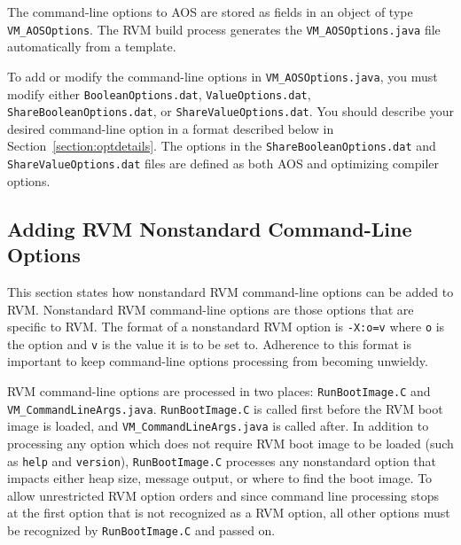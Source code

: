 The command-line options to AOS are
stored as fields in an object of type {\tt VM\_AOSOptions}.
The RVM build process generates the {\tt VM\_AOSOptions.java} 
file automatically from a template.  

To add or modify the command-line options in {\tt VM\_AOSOptions.java},
you must modify either {\tt BooleanOptions.dat}, {\tt ValueOptions.dat},
{\tt ShareBooleanOptions.dat}, or {\tt ShareValueOptions.dat}.
You should describe your desired command-line option in a format 
described below in Section~\ref{section:optdetails}.
The options in the {\tt ShareBooleanOptions.dat} and {\tt ShareValueOptions.dat}
files are defined as both AOS and optimizing compiler options.

\subsection{Adding RVM Nonstandard Command-Line Options}

This section states how nonstandard RVM command-line options can be added
to RVM.  
Nonstandard RVM command-line options are those options that are specific to RVM.
The format of a nonstandard RVM option is {\tt -X:o=v} where {\tt o} is the 
option and {\tt v} is the value it is to be set to.
Adherence to this format is important to keep command-line options processing
from becoming unwieldy.

RVM command-line options are processed in two places: {\tt RunBootImage.C} and
{\tt VM\_CommandLineArgs.java}.  
{\tt RunBootImage.C} is called first before the RVM boot image is loaded,
and {\tt VM\_CommandLineArgs.java} is called after.
In addition to processing any option which does not require RVM boot image
to be loaded (such as {\tt help} and {\tt version}), 
{\tt RunBootImage.C} processes any nonstandard option that impacts either 
heap size, message output, or where to find the boot image.
To allow unrestricted RVM option orders and 
since command line processing stops at the first option that is not 
recognized as a RVM option, all other options must be recognized by
{\tt RunBootImage.C} and passed on.
